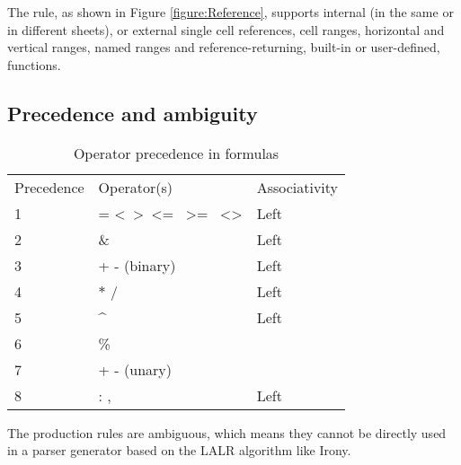 The  rule, as shown in Figure \ref{figure:Reference}, supports internal (in the same or in different sheets), or external single cell references, cell ranges, horizontal and vertical ranges, named ranges and reference-returning, built-in or user-defined, functions.


%	
%
%	

\subsection{Precedence and ambiguity}

\begin{table}
\small
\caption{Operator precedence in formulas}
\label{table:operatorprec}
\begin{tabular}{lll}
Precedence & Operator(s) & Associativity \\
1 & = \textless \  \textgreater \  \textless= \  \textgreater= \  \textless\textgreater & Left         \\
2 & \& & Left \\
3 & + - (binary) & Left \\
4 & $\ast$ / & Left \\
5 & \textasciicircum & Left\footnotemark \\
6 & \% & \\
7 & + - (unary) & \\
8 & : , \texttt{\char32} & Left
\end{tabular}
\end{table}


The production rules are ambiguous, which means they cannot be directly used in a parser generator based on the LALR algorithm like Irony.

